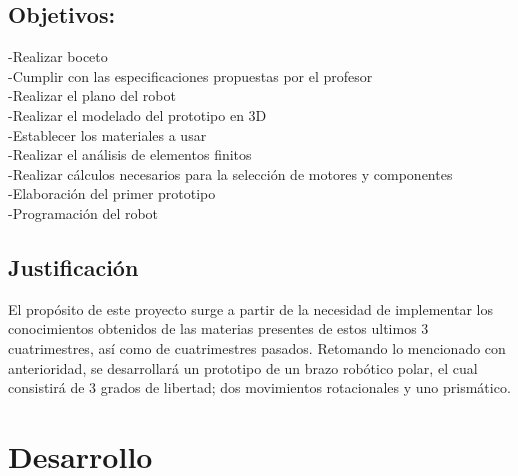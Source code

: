 \documentclass[11pt,a4paper,oldfontcommands,oneside]{memoir}
\begin{document}
\section{Objetivos:}
\noindent
-Realizar boceto\\
-Cumplir con las especificaciones propuestas por el profesor\\
-Realizar el plano del robot\\
-Realizar el modelado del prototipo en 3D\\
-Establecer los materiales a usar\\ 
-Realizar el análisis de elementos finitos\\
-Realizar cálculos necesarios para la selección de motores y componentes\\
-Elaboración del primer prototipo\\
-Programación del robot\\

\section{Justificación}
El propósito de este proyecto surge a partir de la necesidad de implementar los conocimientos obtenidos de las materias presentes de estos ultimos 3 cuatrimestres, así como de cuatrimestres pasados.
Retomando lo mencionado con anterioridad, se desarrollará un prototipo de un brazo robótico polar, el cual consistirá de 3 grados de libertad; dos movimientos rotacionales y uno prismático.

\chapter{Desarrollo}
\end{document}
